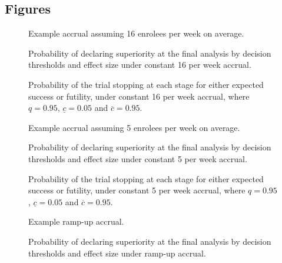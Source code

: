 \documentclass{bmcart}
\begin{document}
\begin{backmatter}

\section*{Figures}

\begin{figure}[h!] 	  	  	  
	\caption{Example accrual assuming 16 enrolees per week on average.}
	\label{fig:accrual-16}
\end{figure}

\begin{figure}[h!]
	\caption{Probability of declaring superiority at the final analysis by decision thresholds and effect size under constant 16 per week accrual.}
	\label{fig:decisions-16}
\end{figure}

\begin{figure}[h!]
\caption{Probability of the trial stopping at each stage for either expected success or futility, under constant 16 per week accrual, where \(q=0.95\), \(\underline{c}=0.05\) and \(\overline{c}=0.95\).}\label{fig:stop-16}
\end{figure}


\begin{figure}[h!] 	  	  	  
	\caption{Example accrual assuming 5 enrolees per week on average.}
	\label{fig:accrual-5}
\end{figure}

\begin{figure}[h!]
	\caption{Probability of declaring superiority at the final analysis by decision thresholds and effect size under constant 5 per week accrual.}
	\label{fig:decisions-5}
\end{figure}

\begin{figure}[h!]
	\caption{Probability of the trial stopping at each stage for either expected success or futility, under constant 5 per week accrual, where \(q=0.95\), \(\underline{c}=0.05\) and \(\overline{c}=0.95\).}\label{fig:stop-5}
\end{figure}

\begin{figure}[h!] 	  	  	  
	\caption{Example ramp-up accrual.}
	\label{fig:accrual-ru}
\end{figure}

\begin{figure}[h!]
	\caption{Probability of declaring superiority at the final analysis by decision thresholds and effect size under ramp-up accrual.}
	\label{fig:decisions-ru}
\end{figure}


\end{backmatter}
\end{document}
